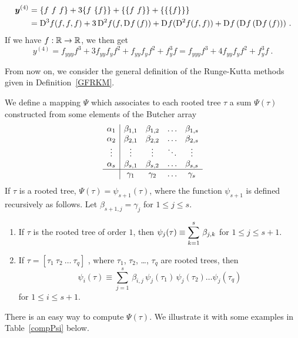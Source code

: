 \begin{egg}
\begin{align*}
\VEC{y}^{(4)} &= \{f\ f\ f\} + 3 \{f \ \{f\}\} + \{\{f \ f\}\} +
\{\{\{f\}\}\} \\
&= \fdiff{f}{3}(f,f,f) + 3\,\fdiff{f}{2}(f,\fdiff{f}{}\,(f)) +
\fdiff{f}{}(\fdiff{f}{2}(f,f)) +
\fdiff{f}{}\,(\fdiff{f}{}\,(\fdiff{f}{}\,(f))) \ .
\end{align*}
If we have $f:\RR\rightarrow \RR$, we then get
\[
y^{(4)} = f_{yyy}f^3 + 3 f_{yy} f_{y} f^2 + f_{yy} f_{y} f^2 +
f_{y}^3f
= f_{yyy}f^3 + 4 f_{yy} f_{y} f^2 + f_{y}^3f \ .
\]
\end{egg}

From now on, we consider the general definition of the Runge-Kutta
methods given in Definition~\ref{GFRKM}.

We define a mapping $\Psi$ which associates to each rooted tree $\tau$
a sum $\Psi(\tau)$ constructed from some elements of the Butcher array
\[
\begin{array}{c|cccc}
\alpha_1 & \beta_{1,1} & \beta_{1,2} & \ldots & \beta_{1,s} \\
\alpha_2 & \beta_{2,1} & \beta_{2,2} & \ldots & \beta_{2,s} \\
\vdots & \vdots & \vdots & \ddots & \vdots \\
\alpha_s & \beta_{s,1} & \beta_{s,2} & \ldots & \beta_{s,s} \\
\hline
 & \gamma_1 & \gamma_2 & \ldots & \gamma_s
\end{array}
\]
If $\tau$ is a rooted tree, $\Psi(\tau) = \psi_{s+1}(\tau)$, where the
function $\psi_{s+1}$ is defined recursively as follows.
Let $\beta_{s+1,j} = \gamma_j$ for $1 \leq j \leq s$.
\begin{enumerate}
\item If $\tau$ is the rooted tree of order $1$,  then
$\DS \psi_j(\tau) \equiv \sum_{k=1}^s\,\beta_{j,k}$
for $1\leq j \leq s+1$.
\item If $\tau = [\tau_1\ \tau_2\ \ldots\ \tau_q]$ , where $\tau_1$,
$\tau_2$, \ldots , $\tau_q$ are rooted trees, then
\[
\psi_i(\tau) \equiv \sum_{j=1}^s\,\beta_{i,j}\,\psi_j(\tau_1)\,\psi_j(\tau_2)
\ldots\psi_j(\tau_q)
\]
for $1\leq i \leq s+1$.
\end{enumerate}

There is an easy way to compute $\Psi(\tau)$.  We illustrate it with
some examples in Table~\ref{compPsi} below.


